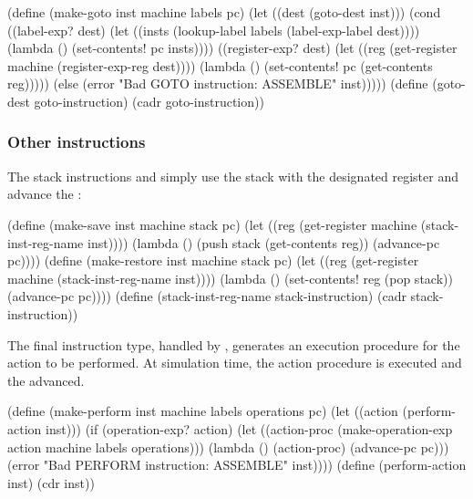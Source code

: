 \begin{codeBlock}
(define (make-goto inst machine labels pc)
  (let ((dest (goto-dest inst)))
    (cond ((label-exp? dest)
           (let ((insts (lookup-label
                          labels
                          (label-exp-label dest))))
             (lambda () (set-contents! pc insts))))
          ((register-exp? dest)
           (let ((reg (get-register
                        machine
                        (register-exp-reg dest))))
             (lambda ()
               (set-contents! pc (get-contents reg)))))
          (else (error "Bad GOTO instruction: ASSEMBLE"
                       inst)))))
(define (goto-dest goto-instruction)
  (cadr goto-instruction))
\end{codeBlock}

\subsubsection*{Other instructions}

The stack instructions  and  simply use the stack with
the designated register and advance the :

\begin{codeBlock}
(define (make-save inst machine stack pc)
  (let ((reg
          (get-register machine
                        (stack-inst-reg-name inst))))
    (lambda ()
      (push stack (get-contents reg))
      (advance-pc pc))))
(define (make-restore inst machine stack pc)
  (let ((reg
          (get-register machine
                        (stack-inst-reg-name inst))))
    (lambda ()
      (set-contents! reg (pop stack))
      (advance-pc pc))))
(define (stack-inst-reg-name stack-instruction)
  (cadr stack-instruction))
\end{codeBlock}

\noindent
The final instruction type, handled by , generates an
execution procedure for the action to be performed.  At simulation time, the
action procedure is executed and the  advanced.

\begin{codeBlock}
(define (make-perform inst
                      machine
                      labels
                      operations
                      pc)
  (let ((action (perform-action inst)))
    (if (operation-exp? action)
        (let ((action-proc
                (make-operation-exp
                  action machine labels operations)))
          (lambda () (action-proc) (advance-pc pc)))
        (error "Bad PERFORM instruction: ASSEMBLE"
               inst))))
(define (perform-action inst) (cdr inst))
\end{codeBlock}

